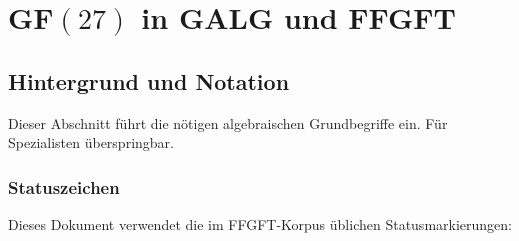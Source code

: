 
\providecommand{\BM}{\textbf{[B]}}
\providecommand{\KM}{\textbf{[K]}}
\providecommand{\SM}{\textbf{[S]}}

\chapter*{GF$(27)$ in GALG und FFGFT}

\begin{abstract}
Doug Matzke berichtet in seiner IPI-Mail vom 1.~September~2026, dass eine
systematische Suche in GALG G$(3)$ (6561 Versuche) kein Element der
Ordnung~26 findet. Dieses Dokument erklärt algebraisch warum, zeigt
wo in G$(6)$ solche Elemente existieren, und zieht die Konsequenzen für
die FFGFT-Massenschicht.

Drei Sätze:
\textbf{(A)}~G$(3) \cong M_2(\text{GF}(9))^2$: Ordnung~26 ist in G$(3)$
algebraisch unmöglich --- kein Suchfehler, sondern zwingend.
\textbf{(B)}~G$(6) \cong M_8(\text{GF}(9))$: Elemente der Ordnung~26 existieren;
ein 5-Blade-Beispiel ist direkt in GALG nachprüfbar.
\textbf{(C)}~GF$(27)$ ist in G$(6)$ als Ordnungsstruktur präsent, nicht als Teilkörper
(da $3 \nmid 8$) --- exakt die FFGFT-Aussage aus Dok.~338.

Konsequenz: $1/\alpha = 3700/27$ lebt auf der G$(3)$/GF$(9)$-Ebene;
die Leptonen-Massenschicht $(m_\mu/m_e)^2 = 43200$ braucht G$(6)$ mit
Ordnung-26-Elementen.
Prüfskript: \texttt{pruef\_341\_gf27\_in\_galg.py} (alle Assertions \BM).
\end{abstract}

\section{Hintergrund und Notation}

Dieser Abschnitt führt die nötigen algebraischen Grundbegriffe ein.
Für Spezialisten überspringbar.

\subsection*{Statuszeichen}

Dieses Dokument verwendet die im FFGFT-Korpus üblichen Statusmarkierungen:


